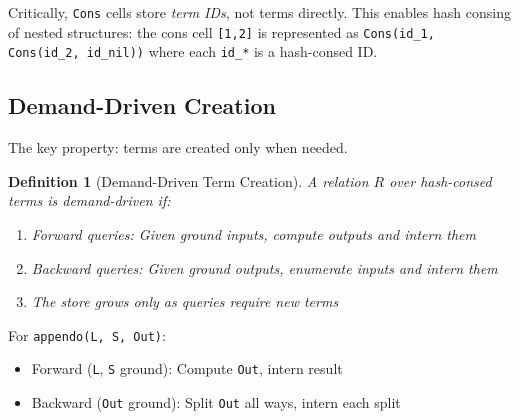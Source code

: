 \documentclass[11pt,a4paper]{article}
\newtheorem{definition}[theorem]{Definition}
\begin{document}
Critically, \texttt{Cons} cells store \emph{term IDs}, not terms directly.
This enables hash consing of nested structures: the cons cell \texttt{[1,2]} is
represented as \texttt{Cons(id\_1, Cons(id\_2, id\_nil))} where each \texttt{id\_*}
is a hash-consed ID.

\subsection{Demand-Driven Creation}

The key property: terms are created only when needed.

\begin{definition}[Demand-Driven Term Creation]
\label{def:demand_driven_chirho}
A relation $R$ over hash-consed terms is \emph{demand-driven} if:
\begin{enumerate}
  \item Forward queries: Given ground inputs, compute outputs and intern them
  \item Backward queries: Given ground outputs, enumerate inputs and intern them
  \item The store grows only as queries require new terms
\end{enumerate}
\end{definition}

For \texttt{appendo(L, S, Out)}:
\begin{itemize}
  \item Forward (\texttt{L}, \texttt{S} ground): Compute \texttt{Out}, intern result
  \item Backward (\texttt{Out} ground): Split \texttt{Out} all ways, intern each split
\end{itemize}
\end{document}
